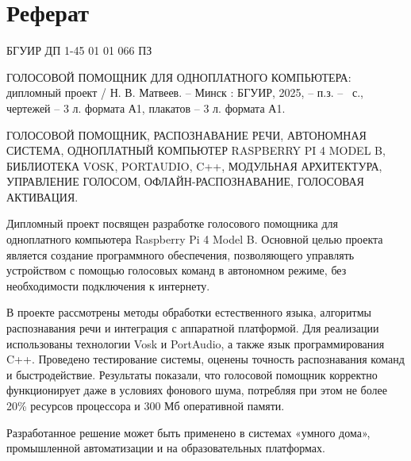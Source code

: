 \section*{Реферат}
\thispagestyle{empty} %

\noindent БГУИР ДП 1-45 01 01 066 ПЗ
\newline


\nohyphens{ГОЛОСОВОЙ ПОМОЩНИК ДЛЯ ОДНОПЛАТНОГО КОМПЬЮТЕРА:} дипломный проект / Н. В. Матвеев. -- Минск : БГУИР, 2025, -- п.з. -- \pageref{LastPage}~с., чертежей -- 3 л. формата А1, плакатов -- 3 л. формата А1.
\newline

ГОЛОСОВОЙ ПОМОЩНИК, РАСПОЗНАВАНИЕ РЕЧИ, АВТОНОМНАЯ СИСТЕМА, ОДНОПЛАТНЫЙ КОМПЬЮТЕР RASPBERRY PI 4 MODEL B, БИБЛИОТЕКА VOSK, PORTAUDIO, C++, МОДУЛЬНАЯ АРХИТЕКТУРА, УПРАВЛЕНИЕ ГОЛОСОМ, ОФЛАЙН-РАСПОЗНАВАНИЕ, ГОЛОСОВАЯ АКТИВАЦИЯ. 
\newline

Дипломный проект посвящен разработке голосового помощника для одноплатного компьютера Raspberry Pi 4 Model B. Основной целью проекта является создание программного обеспечения, позволяющего управлять устройством с помощью голосовых команд в автономном режиме, без необходимости подключения к интернету.

В проекте рассмотрены методы обработки естественного языка, алгоритмы распознавания речи и интеграция с аппаратной платформой. Для реализации использованы технологии Vosk и PortAudio, а также язык программирования C++. Проведено тестирование системы, оценены точность распознавания команд и быстродействие. Результаты показали, что голосовой помощник корректно функционирует даже в условиях фонового шума, потребляя при этом не более 20\% ресурсов процессора и 300 Мб оперативной памяти.

Разработанное решение может быть применено в системах «умного дома», промышленной автоматизации и на образовательных платформах.

\clearpage

